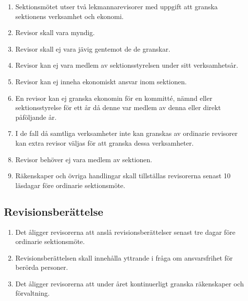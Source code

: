 \documentclass[11pt,a4paper]{article}
\begin{document}
\begin{enumerate}[\thesubsection .1]

  \item Sektionsmötet utser två lekmannarevisorer med uppgift att granska sektionens verksamhet och ekonomi.

\item Revisor skall vara myndig.

\item Revisor skall ej vara jävig gentemot de de granskar.

  
  \item Revisor kan ej vara medlem av sektionsstyrelsen under sitt verksamhetsår.
  
  \item Revisor kan ej inneha ekonomiskt ansvar inom sektionen.

  \item En revisor kan ej granska ekonomin för en kommitté, nämnd eller sektionsstyrelse för ett år då denne var medlem av denna eller direkt påföljande år.
  
  \item I de fall då samtliga verksamheter inte kan granskas av ordinarie revisorer kan extra revisor väljas för att granska dessa verksamheter.
  
  \item Revisor behöver ej vara medlem av sektionen.
  
  \item Räkenskaper och övriga handlingar skall tillställas revisorerna senast 10 läsdagar före ordinarie sektionsmöte.

\end{enumerate}

\subsection{Revisionsberättelse}

\begin{enumerate}[\thesubsection .1]

  \item Det åligger revisorerna att anslå revisionsberättelser senast tre dagar före
  ordinarie sektionsmöte.

  \item Revisionsberättelsen skall innehålla yttrande i fråga om
  ansvarsfrihet för berörda personer.

  \item Det åligger revisorerna att under året kontinuerligt granska
  rä\-ken\-skaper och förvaltning.

\end{enumerate}
\end{document}
